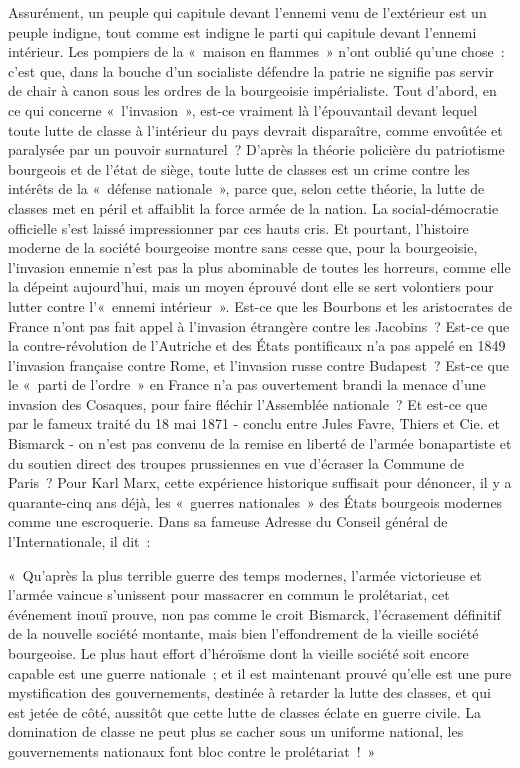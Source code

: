 \documentclass[french,twoside]{book} %
\newenvironment{quoteblock}%
  {\begin{quoting}}
  {\end{quoting}}
\newenvironment{quotebar}{%
    \def\FrameCommand{{\color{rubric!10!}\vrule width 0.5em} \hspace{0.9em}}%
    \def\OuterFrameSep{\itemsep} %
    \MakeFramed {\advance\hsize-\width \FrameRestore}
  }%
  {%
    \endMakeFramed
  }
\renewenvironment{quoteblock}%
  {%
    \savenotes
    \setstretch{0.9}
    \normalfont
    \begin{quotebar}
  }
  {%
    \end{quotebar}
    \spewnotes
  }
\begin{document}
Assurément, un peuple qui capitule devant l’ennemi venu de l’extérieur est un peuple indigne, tout comme est indigne le parti qui capitule devant l’ennemi intérieur. Les pompiers de la « maison en flammes » n’ont oublié qu’une chose : c’est que, dans la bouche d’un socialiste défendre la patrie ne signifie pas servir de chair à canon sous les ordres de la bourgeoisie impérialiste. Tout d’abord, en ce qui concerne « l’invasion », est-ce vraiment là l’épouvantail devant lequel toute lutte de classe à l’intérieur du pays devrait disparaître, comme envoûtée et paralysée par un pouvoir surnaturel ? D'après la théorie policière du patriotisme bourgeois et de l’état de siège, toute lutte de classes est un crime contre les intérêts de la « défense nationale », parce que, selon cette théorie, la lutte de classes met en péril et affaiblit la force armée de la nation. La social-démocratie officielle s’est laissé impressionner par ces hauts cris. Et pourtant, l’histoire moderne de la société bourgeoise montre sans cesse que, pour la bourgeoisie, l’invasion ennemie n’est pas la plus abominable de toutes les horreurs, comme elle la dépeint aujourd’hui, mais un moyen éprouvé dont elle se sert volontiers pour lutter contre l’« ennemi intérieur ». Est-ce que les Bourbons et les aristocrates de France n’ont pas fait appel à l’invasion étrangère contre les Jacobins ? Est-ce que la contre-révolution de l’Autriche et des États pontificaux n’a pas appelé en 1849 l’invasion française contre Rome, et l’invasion russe contre Budapest ? Est-ce que le « parti de l’ordre » en France n’a pas ouvertement brandi la menace d’une invasion des Cosaques, pour faire fléchir l’Assemblée nationale ? Et est-ce que par le fameux traité du 18 mai 1871 - conclu entre Jules Favre, Thiers et Cie. et Bismarck - on n’est pas convenu de la remise en liberté de l’armée bonapartiste et du soutien direct des troupes prussiennes en vue d’écraser la Commune de Paris ? Pour Karl Marx, cette expérience historique suffisait pour dénoncer, il y a quarante-cinq ans déjà, les « guerres nationales » des États bourgeois modernes comme une escroquerie. Dans sa fameuse Adresse du Conseil général de l’Internationale, il dit :\par

\begin{quoteblock}
 \noindent « Qu'après la plus terrible guerre des temps modernes, l’armée victorieuse et l’armée vaincue s’unissent pour massacrer en commun le prolétariat, cet événement inouï prouve, non pas comme le croit Bismarck, l’écrasement définitif de la nouvelle société montante, mais bien l’effondrement de la vieille société bourgeoise. Le plus haut effort d’héroïsme dont la vieille société soit encore capable est une guerre nationale ; et il est maintenant prouvé qu’elle est une pure mystification des gouvernements, destinée à retarder la lutte des classes, et qui est jetée de côté, aussitôt que cette lutte de classes éclate en guerre civile. La domination de classe ne peut plus se cacher sous un uniforme national, les gouvernements nationaux font bloc contre le prolétariat ! »
\end{quoteblock}
\end{document}
